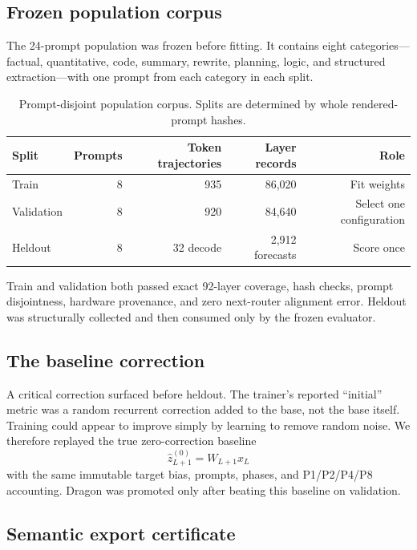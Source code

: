 \documentclass[11pt]{article}
\begin{document}
\subsection{Frozen population corpus}

The 24-prompt population was frozen before fitting. It contains eight categories---factual, quantitative, code, summary, rewrite, planning, logic, and structured extraction---with one prompt from each category in each split.

\begin{table}[t]
\centering
\caption{Prompt-disjoint population corpus. Splits are determined by whole rendered-prompt hashes.}
\label{tab:corpus}
\begin{tabular}{lrrrr}
\toprule
Split & Prompts & Token trajectories & Layer records & Role \\
\midrule
Train & 8 & 935 & 86,020 & Fit weights \\
Validation & 8 & 920 & 84,640 & Select one configuration \\
Heldout & 8 & 32 decode & 2,912 forecasts & Score once \\
\bottomrule
\end{tabular}
\end{table}

Train and validation both passed exact 92-layer coverage, hash checks, prompt disjointness, hardware provenance, and zero next-router alignment error. Heldout was structurally collected and then consumed only by the frozen evaluator.

\subsection{The baseline correction}

A critical correction surfaced before heldout. The trainer's reported ``initial'' metric was a random recurrent correction added to the base, not the base itself. Training could appear to improve simply by learning to remove random noise. We therefore replayed the true zero-correction baseline
\begin{equation}
\hat z_{L+1}^{(0)}=W_{L+1}x_L
\end{equation}
with the same immutable target bias, prompts, phases, and P1/P2/P4/P8 accounting. Dragon was promoted only after beating this baseline on validation.

\subsection{Semantic export certificate}
\end{document}
